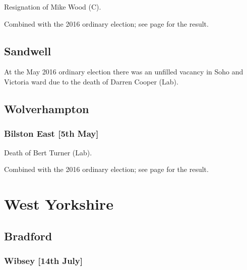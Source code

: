 \documentclass[a4paper,openany]{book}
\begin{document}
\begin{resultsiii}

Resignation of Mike Wood (C).

Combined with the 2016 ordinary election; see page \pageref{PedmoreStourbridgeEastDudley} for the result.

\subsection*{Sandwell}

At the May 2016 ordinary election there was an unfilled vacancy in Soho and Victoria ward due to the death of Darren Cooper (Lab).

\subsection*{Wolverhampton}

\subsubsection*{Bilston East \hspace*{\fill}\nolinebreak[1]%
\enspace\hspace*{\fill}
[5th May]}


Death of Bert Turner (Lab).

Combined with the 2016 ordinary election; see page \pageref{BilstonEastWolverhampton} for the result.

\section{West Yorkshire}

\subsection*{Bradford}

\subsubsection*{Wibsey \hspace*{\fill}\nolinebreak[1]%
\enspace\hspace*{\fill}
[14th July]}


\end{resultsiii}
\end{document}
